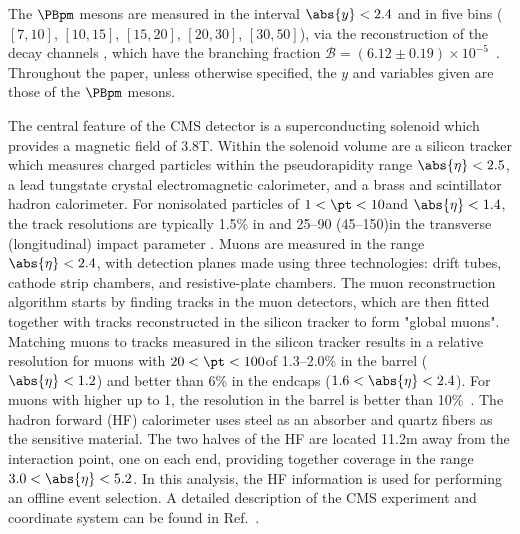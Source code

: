 The $\PBpm$ mesons are measured in the interval $\abs{y}<2.4$ and in five \pt bins ($[7,10]$, $[10,15]$, $[15,20]$, $[20,30]$, $[30,50]$\GeVc), via the reconstruction of the decay channels \Bplusminusdecay, which have the branching fraction $\mathcal{B} = (6.12 \pm 0.19) \times 10^{-5}$~\cite{pdg:2016}. Throughout the paper, unless otherwise specified, the $y$ and \pt variables given are those of the $\PBpm$ mesons.

The central feature of the CMS detector is a superconducting solenoid which provides a magnetic field of 3.8\unit{T}. Within the solenoid volume are a silicon tracker which measures charged particles within the pseudorapidity range $\abs{\eta} < 2.5$, a lead tungstate crystal electromagnetic calorimeter, and a brass and scintillator hadron calorimeter. For nonisolated particles of $1 < \pt < 10$\GeVc and $\abs{\eta} < 1.4$, the track resolutions are typically 1.5\% in \pt and 25--90 (45--150)\mum in the transverse (longitudinal) impact parameter \cite{TRK-11-001}. Muons are measured in the range $\abs{\eta} < 2.4$, with detection planes made using three technologies: drift tubes, cathode strip chambers, and resistive-plate chambers. The muon reconstruction algorithm starts by finding tracks in the muon detectors, which are then fitted together with tracks reconstructed in the silicon tracker to form "global muons". Matching muons to tracks measured in the silicon tracker results in a relative \pt resolution for muons with $20 < \pt < 100$\GeVc of 1.3--2.0\% in the barrel ($\abs{\eta} < 1.2$) and better than 6\% in the endcaps ($1.6 < \abs{\eta} < 2.4$).
For muons with higher \pt up to 1\TeVc, the \pt resolution in the barrel is better than 10\%~\cite{Chatrchyan:2012xi}.  The hadron forward (HF) calorimeter uses steel as an absorber and quartz fibers as the sensitive material. The two halves of the HF are located 11.2\unit{m} away from the interaction point, one on each end, providing together coverage in the range $3.0 < \abs{\eta} < 5.2$. In this analysis, the HF information is used for performing an offline event selection. A detailed description of the CMS experiment and coordinate system can be found in Ref.~\cite{bib_CMS}.


